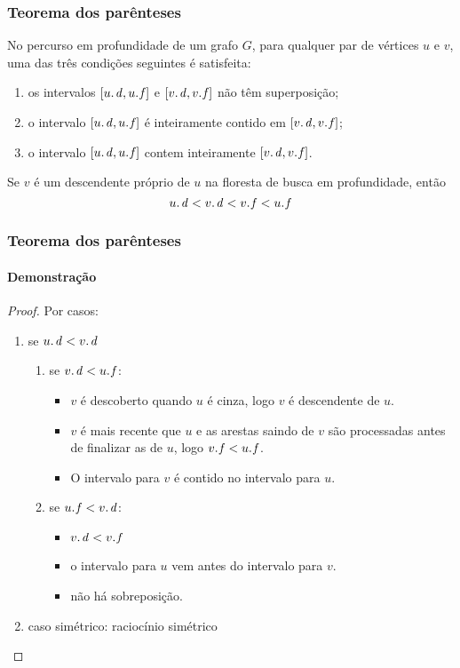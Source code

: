 \documentclass{beamer}
\begin{document}
\begin{frame}
\frametitle{Teorema dos parênteses}

\begin{theorem}
No percurso em profundidade de um grafo $G$, para qualquer par de vértices $u$ e $v$, uma
das três condições seguintes é satisfeita:
\begin{enumerate}
\item os intervalos $[\attrib{u}{d}, \attrib{u}{f}]$ e $[\attrib{v}{d}, \attrib{v}{f}]$ não têm superposição;
\item o intervalo $[\attrib{u}{d}, \attrib{u}{f}]$ é inteiramente contido em $[\attrib{v}{d}, \attrib{v}{f}]$;
\item o intervalo $[\attrib{u}{d}, \attrib{u}{f}]$ contem inteiramente $[\attrib{v}{d}, \attrib{v}{f}]$.
\end{enumerate}
\end{theorem}

\begin{corollary}
Se $v$ é um descendente próprio de $u$ na floresta de busca em profundidade, então
$$\attrib{u}{d} < \attrib{v}{d} < \attrib{v}{f} < \attrib{u}{f}$$
\end{corollary}

\end{frame}

\begin{frame}
\frametitle{Teorema dos parênteses}
\framesubtitle{Demonstração}

\begin{proof}
Por casos:
\begin{enumerate}
\item se $\attrib{u}{d} < \attrib{v}{d}$
\begin{enumerate}
\item se $\attrib{v}{d} < \attrib{u}{f}$: 
\begin{itemize}
\item $v$ é descoberto quando $u$ é cinza, logo $v$ é descendente de $u$.
\item $v$ é mais recente que $u$ e as arestas saindo de $v$ são processadas 
  antes de finalizar as de $u$, logo $\attrib{v}{f} < \attrib{u}{f}$. 
\item O intervalo para $v$ é contido no intervalo para $u$.
\end{itemize}
\item se $\attrib{u}{f} < \attrib{v}{d}$: 
\begin{itemize}
\item $\attrib{v}{d} < \attrib{v}{f}$
\item o intervalo para $u$ vem antes do intervalo para $v$. 
\item não há sobreposição.
\end{itemize}
\end{enumerate}
\item caso simétrico: raciocínio simétrico
\end{enumerate}
\end{proof}

\end{frame}
\end{document}
